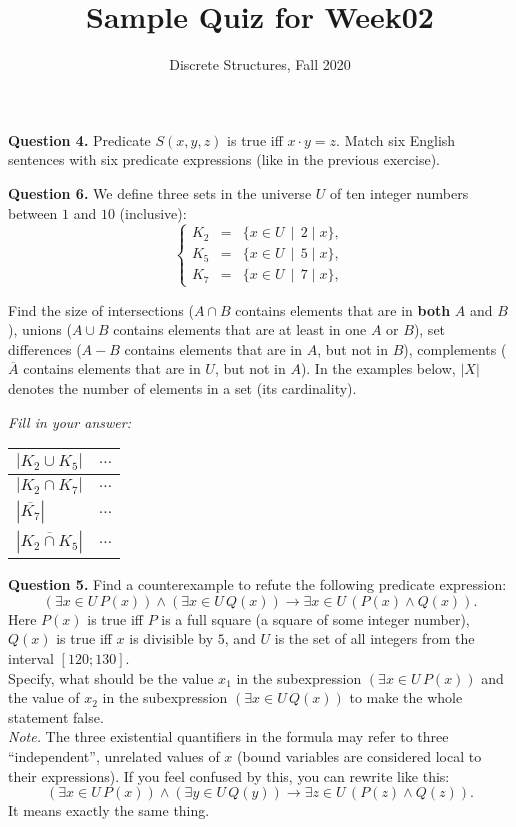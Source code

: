 \documentclass[jou]{apa6}
\title{Sample Quiz for Week02}
\author{Discrete Structures, Fall 2020}
\affiliation{RBS}
\begin{document}
\maketitle



\vspace{10pt}
{\bf Question 4.} Predicate $S(x, y, z)$ is true iff $x \cdot y = z$. 
Match six English sentences with six predicate expressions (like in the previous
exercise).


\vspace{10pt}
{\bf Question 6.} We define three sets in the universe $U$ of ten integer numbers
between $1$ and $10$ (inclusive):
$$\left\{ \begin{array}{rcl}
K_2 & = & \{ x \in U \,\mid\, 2 \mid x \},\\
K_5 & = & \{ x \in U \,\mid\, 5 \mid x \},\\
K_7 & = & \{ x \in U \,\mid\, 7 \mid x \},
\end{array} \right.$$

Find the size of intersections ($A \cap B$ contains elements that are in {\bf both} 
$A$ and $B$), unions ($A \cup B$ contains elements that are at least in one
$A$ or $B$), set differences ($A - B$ contains elements that are in $A$, but not in $B$), 
complements ($\overline{A}$ contains elements that are in $U$, but not in $A$). 
In the examples below, $|X|$ denotes the number of elements in a set (its cardinality).


{\em Fill in your answer:}

\begin{tabular}{ll} \hline
$\left| K_2 \cup K_5 \right|$ & $\ldots$ \\ \hline
$\left| K_2 \cap K_7 \right|$ & $\ldots$ \\ \hline
$\left| \overline{K_7} \right|$ & $\ldots$ \\ \hline
$\left| \overline{K_2 \cap K_5} \right|$ & $\ldots$ \\ \hline
\end{tabular}





\vspace{10pt}
{\bf Question 5.}
Find a counterexample to refute the following predicate expression:
$$(\exists x \in U\,P(x)) \wedge (\exists x\in U\,Q(x)) \rightarrow \exists x\in U\,(P(x) \wedge Q(x)).$$
Here $P(x)$ is true iff $P$ is a full square (a square of some integer number), 
$Q(x)$ is true iff $x$ is divisible by $5$, and $U$ is the set of all integers 
from the interval $[120;130]$.\\
Specify, what should be the value $x_1$ in the subexpression $(\exists x \in U\,P(x))$ 
and the value of $x_2$ in the subexpression $(\exists x \in U\,Q(x))$ to 
make the whole statement false.\\
{\em Note.} The three existential quantifiers in the formula may refer to 
three ``independent'', unrelated values of $x$ (bound variables are considered local to their expressions). 
If you feel confused by this, you can rewrite like this:
$$(\exists x \in U\,P(x)) \wedge (\exists y\in U\,Q(y)) \rightarrow \exists z\in U\,(P(z) \wedge Q(z)).$$
It means exactly the same thing.
\end{document}
